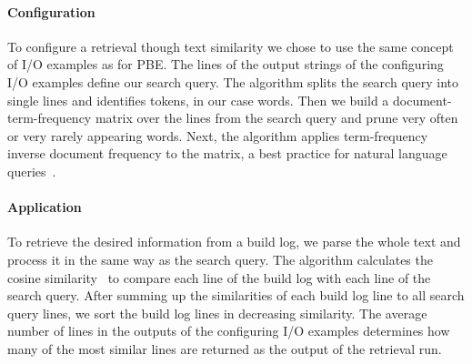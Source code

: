 \documentclass[\myrootdir/main.tex]{subfiles}
\begin{document}
\paragraph{Configuration}
To configure a retrieval though text similarity we chose to use the same concept of I/O examples as for PBE\@.
The lines of the output strings of the configuring I/O examples define our search query.
The algorithm splits the search query into single lines and identifies tokens, in our case words.
Then we build a document-term-frequency matrix over the lines from the search query and prune very often or very rarely appearing words.
Next, the algorithm applies term-frequency inverse document frequency to the matrix, a best practice for natural language queries~\cite{lee1997document}.

\paragraph{Application}
To retrieve the desired information from a build log, we parse the whole text and process it in the same way as the search query.
The algorithm calculates the cosine similarity~\cite{korenius2007principal} to compare each line of the build log with each line of the search query.
After summing up the similarities of each build log line to all search query lines, we sort the build log lines in decreasing similarity.
The average number of lines in the outputs of the configuring I/O examples determines how many of the most similar lines are returned as the output of the retrieval run.

\end{document}
